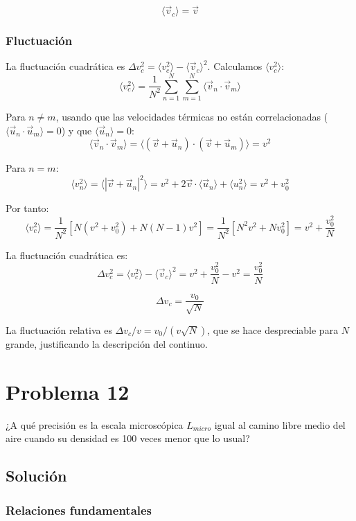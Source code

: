 \documentclass[a4paper]{article}
\begin{document}
$$
\boxed{\langle \vec{v}_c \rangle = \vec{v}}
$$

\subsubsection{Fluctuación}

La fluctuación cuadrática es $\Delta v_c^2 = \langle v_c^2 \rangle - \langle \vec{v}_c \rangle^2$. Calculamos $\langle v_c^2 \rangle$:
$$
\langle v_c^2 \rangle = \frac{1}{N^2}\sum_{n=1}^{N}\sum_{m=1}^{N}\langle \vec{v}_n \cdot \vec{v}_m \rangle
$$

Para $n \neq m$, usando que las velocidades térmicas no están correlacionadas ($\langle \vec{u}_n \cdot \vec{u}_m \rangle = 0$) y que $\langle \vec{u}_n \rangle = 0$:
$$
\langle \vec{v}_n \cdot \vec{v}_m \rangle = \langle (\vec{v}+\vec{u}_n)\cdot(\vec{v}+\vec{u}_m)\rangle = v^2
$$

Para $n = m$:
$$
\langle v_n^2 \rangle = \langle |\vec{v}+\vec{u}_n|^2 \rangle = v^2 + 2\vec{v}\cdot\langle\vec{u}_n\rangle + \langle u_n^2 \rangle = v^2 + v_0^2
$$

Por tanto:
$$
\langle v_c^2 \rangle = \frac{1}{N^2}\left[N(v^2 + v_0^2) + N(N-1)v^2\right] = \frac{1}{N^2}\left[N^2 v^2 + Nv_0^2\right] = v^2 + \frac{v_0^2}{N}
$$

La fluctuación cuadrática es:
$$
\Delta v_c^2 = \langle v_c^2 \rangle - \langle \vec{v}_c \rangle^2 = v^2 + \frac{v_0^2}{N} - v^2 = \frac{v_0^2}{N}
$$

$$
\boxed{\Delta v_c = \frac{v_0}{\sqrt{N}}}
$$

La fluctuación relativa es $\Delta v_c / v = v_0/(v\sqrt{N})$, que se hace despreciable para $N$ grande, justificando la descripción del continuo.

\section{Problema 12}
¿A qué precisión es la escala microscópica $L_{micro}$ igual al camino libre medio del aire cuando su densidad es 100 veces menor que lo usual?

\subsection{Solución}

\subsubsection{Relaciones fundamentales}
\end{document}

